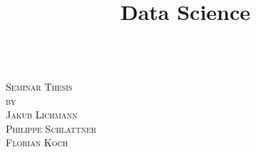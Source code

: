 \makeatletter
\begin{titlepage}
\title{Data Science}
\begin{center}

\vspace*{2.5cm}
\LARGE
\textsc{}\\
\vspace{2cm}
\Large
\textsc{Seminar Thesis\\[1\baselineskip] \normalsize
by\\[0.2\baselineskip]
Jakub Lichmann\\
Philippe Schlattner\\
Florian Koch\\
\vspace{2cm}
\small \textsc{\@date}} %

\vspace{5cm}
\small
{}\\
\end{center}

\vspace{0.5cm}
\tiny


\end{titlepage}
\makeatother
